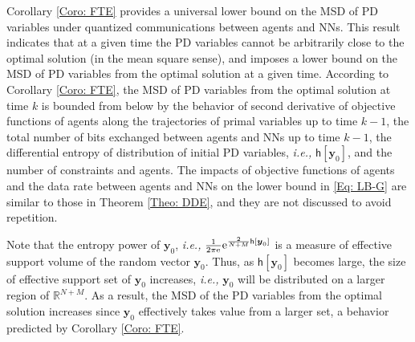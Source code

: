 \documentclass[10pt,twocolumn,twoside]{IEEEtran}
\begin{document}
Corollary \ref{Coro: FTE} provides a universal lower bound on the MSD of PD variables under quantized communications between agents and NNs.  This result indicates that at a given time the PD variables cannot be arbitrarily close to the optimal solution (in the mean square sense), and imposes a lower bound on the MSD of PD variables from the optimal solution at a given time. According to Corollary \ref{Coro: FTE}, the MSD of PD variables from the optimal solution at time $k$ is bounded from below by the behavior of second derivative of objective functions of agents along the trajectories of primal variables up to time $k-1$, the total number of bits exchanged between agents and NNs up to time $k-1$, the differential entropy of distribution of initial PD variables, \emph{i.e.,} $\mathsf{h}\left[{\ensuremath{\boldsymbol{{y}}}}_{0}\right]$, and the number of constraints and agents. The impacts of objective functions of agents and the data rate between agents and NNs on the lower bound in \eqref{Eq: LB-G} are similar to those in Theorem \ref{Theo: DDE}, and they are not discussed to avoid repetition.

Note that the entropy power of ${\ensuremath{\boldsymbol{{y}}}}_{0}$, \emph{i.e.,} $\frac{1}{2\pi{\ensuremath{{\rm e}^{{}}}}}{\ensuremath{{\rm e}^{{\frac{2}{N+M}\mathsf{h}\left[{\ensuremath{\boldsymbol{{y}}}}_{0}\right]}}}}$ is a measure of effective support volume of the random vector ${\ensuremath{\boldsymbol{{y}}}}_{0}$. Thus, as $\mathsf{h}\left[{\ensuremath{\boldsymbol{{y}}}}_{0}\right]$ becomes large, the size of effective support set of ${\ensuremath{\boldsymbol{{y}}}}_{0}$ increases, \emph{i.e.,} ${\ensuremath{\boldsymbol{{y}}}}_0$ will be distributed on a larger region of ${\ensuremath{{\ensuremath{\mathbb{{R}}}}}}^{N+M}$. As a result, the MSD of the PD variables from the optimal solution increases since ${\ensuremath{\boldsymbol{{y}}}}_{0}$ effectively takes value from a larger set,  a behavior predicted by Corollary \ref{Coro: FTE}.
\end{document}
